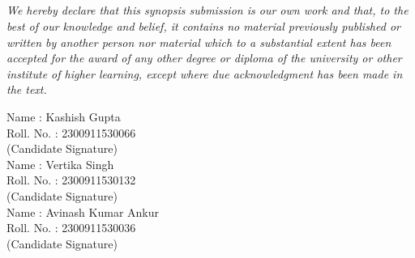\begin{center}
\chapter*{}   
\end{center}

\doublespacing
\textit{We hereby declare that this synopsis submission is our own work and that, to the best of our knowledge and belief, it contains no material previously published or written by another person nor material which to a substantial extent has been accepted for the award of any other degree or diploma of the university or other institute of higher learning, except where due acknowledgment has been made in the text.}

\vspace{5mm}
\begin{flushleft}
Name : Kashish Gupta\\
Roll. No. : 2300911530066 \\
\vspace{5mm}
(Candidate Signature) \\
\vspace{5mm}
Name : Vertika Singh\\
Roll. No. : 2300911530132\\
\vspace{5mm}
(Candidate Signature) \\
\vspace{5mm}
Name : Avinash Kumar Ankur\\
Roll. No. : 2300911530036\\
\vspace{5mm}
(Candidate Signature) \\
\vspace{5mm}
\vspace{5mm}
\end{flushleft}
\restoregeometry
\newpage
\begin{center}
\chapter*{} 
\end{center}

